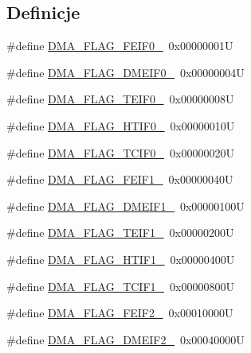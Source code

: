 \subsection*{Definicje}
\begin{DoxyCompactItemize}
\item 
\#define \hyperlink{group___d_m_a__flag__definitions_ga6f44b274316a463c9302d770b8205640}{D\+M\+A\+\_\+\+F\+L\+A\+G\+\_\+\+F\+E\+I\+F0\+\_}~0x00000001U
\item 
\#define \hyperlink{group___d_m_a__flag__definitions_gaee0e6da831d62bc84e9e28e59b8e9ede}{D\+M\+A\+\_\+\+F\+L\+A\+G\+\_\+\+D\+M\+E\+I\+F0\+\_}~0x00000004U
\item 
\#define \hyperlink{group___d_m_a__flag__definitions_gab98ef70ba0c1498d4c967a10b3f6e67f}{D\+M\+A\+\_\+\+F\+L\+A\+G\+\_\+\+T\+E\+I\+F0\+\_}~0x00000008U
\item 
\#define \hyperlink{group___d_m_a__flag__definitions_ga976fee242270824013f1fc0b6bd4c446}{D\+M\+A\+\_\+\+F\+L\+A\+G\+\_\+\+H\+T\+I\+F0\+\_}~0x00000010U
\item 
\#define \hyperlink{group___d_m_a__flag__definitions_ga19dfe70176841c6972818e279ba02436}{D\+M\+A\+\_\+\+F\+L\+A\+G\+\_\+\+T\+C\+I\+F0\+\_}~0x00000020U
\item 
\#define \hyperlink{group___d_m_a__flag__definitions_ga16a04159a9a7c434ac02e5c6ff630b2e}{D\+M\+A\+\_\+\+F\+L\+A\+G\+\_\+\+F\+E\+I\+F1\+\_}~0x00000040U
\item 
\#define \hyperlink{group___d_m_a__flag__definitions_gaae665bbda7f888f0b8ac3d10688bfc5d}{D\+M\+A\+\_\+\+F\+L\+A\+G\+\_\+\+D\+M\+E\+I\+F1\+\_}~0x00000100U
\item 
\#define \hyperlink{group___d_m_a__flag__definitions_ga9d4c5bac7bdcdb23b4d38186e918ae9e}{D\+M\+A\+\_\+\+F\+L\+A\+G\+\_\+\+T\+E\+I\+F1\+\_}~0x00000200U
\item 
\#define \hyperlink{group___d_m_a__flag__definitions_ga2c9522a20a6ace45958413034b7f3af8}{D\+M\+A\+\_\+\+F\+L\+A\+G\+\_\+\+H\+T\+I\+F1\+\_}~0x00000400U
\item 
\#define \hyperlink{group___d_m_a__flag__definitions_ga9546185449ae979fad0aa5e33310c0ab}{D\+M\+A\+\_\+\+F\+L\+A\+G\+\_\+\+T\+C\+I\+F1\+\_}~0x00000800U
\item 
\#define \hyperlink{group___d_m_a__flag__definitions_gaba3e6950c089013f9f675b83d78cab5c}{D\+M\+A\+\_\+\+F\+L\+A\+G\+\_\+\+F\+E\+I\+F2\+\_}~0x00010000U
\item 
\#define \hyperlink{group___d_m_a__flag__definitions_ga8963d8e64fa5610d7617d8fe81c76704}{D\+M\+A\+\_\+\+F\+L\+A\+G\+\_\+\+D\+M\+E\+I\+F2\+\_}~0x00040000U

\end{DoxyCompactItemize}
